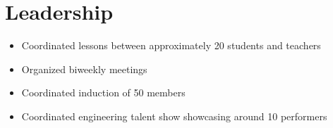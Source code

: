 \documentclass{my_resume}
\begin{document}
\section{Leadership}
    \begin{itemize}
        \item Coordinated lessons between approximately 20 students and teachers
        \item Organized biweekly meetings
    \end{itemize}
    \begin{itemize}
        \item Coordinated induction of 50 members
    \end{itemize}
    \begin{itemize}
        \item Coordinated engineering talent show showcasing around 10 performers
    \end{itemize}
\end{document}
